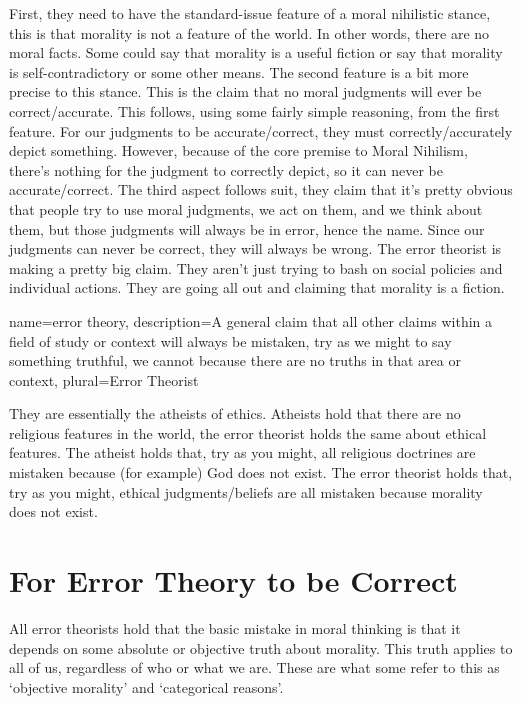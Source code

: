 First, they need to have the standard-issue feature of a moral nihilistic stance, this is that morality is not a feature of the world. In other words, there are no moral facts. Some could say that morality is a useful fiction or say that morality is self-contradictory or some other means. The second feature is a bit more precise to this stance. This is the claim that no moral judgments will ever be correct/accurate.  This follows, using some fairly simple reasoning, from the first feature. For our judgments to be accurate/correct, they must correctly/accurately depict something. However, because of the core premise to Moral Nihilism, there's nothing for the judgment to correctly depict, so it can never be accurate/correct. The third aspect follows suit, they claim that it's pretty obvious that people try to use moral judgments, we act on them, and we think about them, but those judgments will always be in error, hence the name. Since our judgments can never be correct, they will always be wrong. The error theorist is making a pretty big claim. They aren’t just trying to bash on social policies and individual actions. They are going all out and claiming that morality is a fiction.

{
  name=error theory,
  description={A general claim that all other claims within a field of study or context will always be mistaken, try as we might to say something truthful, we cannot because there are no truths in that area or context},
plural=Error Theorist
}


They are essentially the atheists of ethics. Atheists hold that there are no religious features in the world, the error theorist holds the same about ethical features. The atheist holds that, try as you might, all religious doctrines are mistaken because (for example) God does not exist. The error theorist holds that, try as you might, ethical judgments/beliefs are all mistaken because morality does not exist.

\section{For Error Theory to be Correct}

All error theorists hold that the basic mistake in moral thinking is that it depends on some absolute or objective truth about morality. This truth applies to all of us, regardless of who or what we are. These are what some refer to this as ‘objective morality’ and ‘categorical reasons’.

